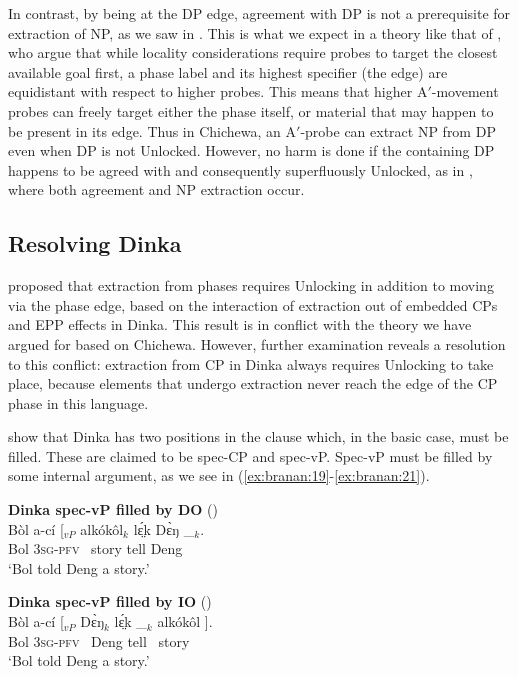 \documentclass[output=paper,colorlinks,citecolor=brown]{langscibook}
\begin{document}
In contrast, by being at the DP edge, agreement with DP is not a prerequisite for extraction of NP, as we saw in . This is what we expect in a theory like that of \citet{RackowskiRichards2005}, who argue that while locality considerations require probes to target the closest available goal first, a phase label and its highest specifier (the edge) are equidistant with respect to higher probes. This means that higher A$'$-movement probes can freely target either the phase itself, or material that may happen to be present in its edge. Thus in Chichewa, an A$'$-probe can extract NP from DP even when DP is not Unlocked. However, no harm is done if the containing DP happens to be agreed with and consequently superfluously Unlocked, as in , where both agreement and NP extraction occur.

\subsection{Resolving Dinka}\label{sec:branan:5.2}

\citet{VanUrkRichards2015} proposed that extraction from phases requires Unlocking in addition to moving via the phase edge, based on the interaction of extraction out of embedded CPs and EPP effects in Dinka. This result is in conflict with the theory we have argued for based on Chichewa. However, further examination reveals a resolution to this conflict: extraction from CP in Dinka always requires Unlocking to take place, because elements that undergo extraction never reach the edge of the CP phase in this language.

\citeauthor{VanUrkRichards2015} show that Dinka has two positions in the clause which, in the basic case, must be filled. These are claimed to be spec-CP and spec-vP. Spec-vP must be filled by some internal argument, as we see in (\ref{ex:branan:19}-\ref{ex:branan:21}).

\ea%
    \label{ex:branan:19}
    \textbf{Dinka spec-vP filled by DO} \hfill{(\citealt[ex. 33b]{VanUrkRichards2015})}\\
    \gll    B\`{o}l a-c\'{i} [$_{vP}$ alk\'{o}k\^{o}l$_{k}$  lɛ̤́k  D\`{ɛ}ŋ \_$_{k}$. \\
            Bol \textsc{3sg-pfv} \,  story tell Deng \\
    \glt    `Bol told Deng a story.'
\z

\ea%
    \label{ex:branan:20}
    \textbf{Dinka spec-vP filled by IO} \hfill{(\citealt[ex. 33a]{VanUrkRichards2015})}\\
    \gll    B\`{o}l a-c\'{i} [$_{vP}$ D\`{ɛ}ŋ$_{k}$ lɛ̤́k \_$_{k}$ alk\'{o}k\^{o}l ]. \\
            Bol \textsc{3sg-pfv} \,  Deng tell \,  story \\
    \glt    `Bol told Deng a story.'
\z
\end{document}
